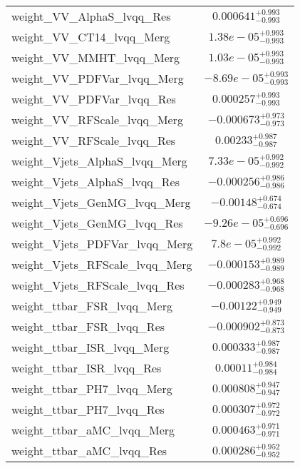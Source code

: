 \begin{tabular}{|l|c|}
weight\_VV\_AlphaS\_lvqq\_Res & $0.000641^{+0.993}_{-0.993}$ \\
weight\_VV\_CT14\_lvqq\_Merg & $1.38e-05^{+0.993}_{-0.993}$ \\
weight\_VV\_MMHT\_lvqq\_Merg & $1.03e-05^{+0.993}_{-0.993}$ \\
weight\_VV\_PDFVar\_lvqq\_Merg & $-8.69e-05^{+0.993}_{-0.993}$ \\
weight\_VV\_PDFVar\_lvqq\_Res & $0.000257^{+0.993}_{-0.993}$ \\
weight\_VV\_RFScale\_lvqq\_Merg & $-0.000673^{+0.973}_{-0.973}$ \\
weight\_VV\_RFScale\_lvqq\_Res & $0.00233^{+0.987}_{-0.987}$ \\
weight\_Vjets\_AlphaS\_lvqq\_Merg & $7.33e-05^{+0.992}_{-0.992}$ \\
weight\_Vjets\_AlphaS\_lvqq\_Res & $-0.000256^{+0.986}_{-0.986}$ \\
weight\_Vjets\_GenMG\_lvqq\_Merg & $-0.00148^{+0.674}_{-0.674}$ \\
weight\_Vjets\_GenMG\_lvqq\_Res & $-9.26e-05^{+0.696}_{-0.696}$ \\
weight\_Vjets\_PDFVar\_lvqq\_Merg & $7.8e-05^{+0.992}_{-0.992}$ \\
weight\_Vjets\_RFScale\_lvqq\_Merg & $-0.000153^{+0.989}_{-0.989}$ \\
weight\_Vjets\_RFScale\_lvqq\_Res & $-0.000283^{+0.968}_{-0.968}$ \\
weight\_ttbar\_FSR\_lvqq\_Merg & $-0.00122^{+0.949}_{-0.949}$ \\
weight\_ttbar\_FSR\_lvqq\_Res & $-0.000902^{+0.873}_{-0.873}$ \\
weight\_ttbar\_ISR\_lvqq\_Merg & $0.000333^{+0.987}_{-0.987}$ \\
weight\_ttbar\_ISR\_lvqq\_Res & $0.00011^{+0.984}_{-0.984}$ \\
weight\_ttbar\_PH7\_lvqq\_Merg & $0.000808^{+0.947}_{-0.947}$ \\
weight\_ttbar\_PH7\_lvqq\_Res & $0.000307^{+0.972}_{-0.972}$ \\
weight\_ttbar\_aMC\_lvqq\_Merg & $0.000463^{+0.971}_{-0.971}$ \\
weight\_ttbar\_aMC\_lvqq\_Res & $0.000286^{+0.952}_{-0.952}$ \\
\hline
\end{tabular}
